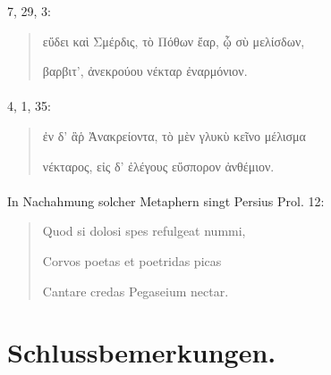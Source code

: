 \documentclass[a4paper, 11pt, oneside]{article}
\begin{document}
7, 29, 3:
\begin{quotation}
εὔδει καὶ Σμέρδις, τὸ Πόθων ἔαρ, ᾧ σὺ μελίσδων,

βαρβιτ', ἀνεκρούου νέκταρ ἐναρμόνιον.
\end{quotation}
\paragraph{}
4, 1, 35:
\begin{quotation}
ἐν δ' ἃῥ Ἀνακρείοντα, τὸ μὲν γλυκὺ κεῖνο μέλισμα

νέκταρος, εἰς δ' ἐλέγους εὔσπορον ἀνθέμιον.
\end{quotation}
\paragraph{}
In Nachahmung solcher Metaphern singt Persius Prol. 12:
\begin{quotation}
Quod si dolosi spes refulgeat nummi,

Corvos poetas et poetridas picas

Cantare credas Pegaseium nectar.
\end{quotation}
\paragraph{}
\clearpage
\section{Schlussbemerkungen.}
\end{document}
